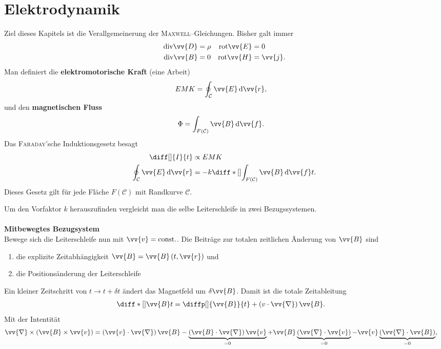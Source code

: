 \documentclass[a4paper,12pt]{article}
\newcommand{\td}{\,\text{d}}
\numberwithin{equation}{section}
\begin{document}
\newpage
\section{Elektrodynamik}
Ziel dieses Kapitels ist die Verallgemeinerung der \textsc{Maxwell}--Gleichungen. Bisher galt immer
\begin{align} 
        \text{div}\vv{D}&=\rho &\text{rot}\vv{E}&=0\\
        \text{div}\vv{B}&=0&\text{rot}\vv{H}&=\vv{j}
.\end{align} 
Man definiert die \textbf{elektromotorische Kraft} (eine Arbeit)
\begin{align} 
        EMK&=\oint_{\mathcal{C}}^{}\vv{E}\td \vv{r}
,\end{align} 
und den \textbf{magnetischen Fluss} 
\begin{align} 
        \Phi &=\int_{F\left(\mathcal{C}\right)}^{}\vv{B}\td \vv{f}
.\end{align} 
Das \textsc{Faraday}'sche Induktionsgesetz besagt
\begin{align} 
        \diff[]{I}{t}&\propto EMK\\
        \oint_{\mathcal{C}}^{}\vv{E}\td \vv{r}&=-k\diff*[]{\int_{F\left(\mathcal{C}\right)}^{}\vv{B}\td \vv{f}}{t}
.\end{align} 
Dieses Gesetz gilt für jede Fläche $F\left(\mathcal{C}\right)$ mit Randkurve $\mathcal{C}$.\par
Um den Vorfaktor $k$ herauszufinden vergleicht man die selbe Leiterschleife in zwei Bezugssystemen.
\\\hfill\\\textbf{Mitbewegtes Bezugsystem}\\ 
Bewege sich die Leiterschleife nun mit $\vv{v}=\text{const.}$. Die Beiträge zur totalen zeitlichen Änderung von $\vv{B}$ sind
\begin{enumerate}[label=\roman*)]
        \item die explizite Zeitabhängigkeit $\vv{B}=\vv{B}\left(t,\vv{r}\right)$ und
        \item die Positionsänderung der Leiterschleife
\end{enumerate}
Ein kleiner Zeitschritt von $t\rightarrow t+\delta t$ ändert das Magnetfeld um $\delta \vv{B}$. Damit ist die totale Zeitableitung
\begin{align} 
        \diff*[]{\vv{B}}{t}&=\diffp[]{\vv{B}}{t}+\left(v\cdot \vv{\nabla }\right)\vv{B}
.\end{align} 
Mit der Intentität
\begin{align} 
        \vv{\nabla }\times \left(\vv{B}\times \vv{v}\right)&=\left(\vv{v}\cdot \vv{\nabla }\right)\vv{B}-\underbrace{\left(\vv{B}\cdot \vv{\nabla }\right)\vv{v}}_{=0}+\vv{B}\underbrace{\left(\vv{\nabla }\cdot \vv{v}\right)}_{=0}-\vv{v}\underbrace{\left(\vv{\nabla }\cdot \vv{B}\right)}_{=0}
,\end{align} 
\end{document}
